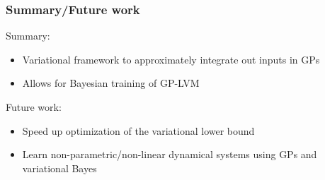\documentclass{beamer}
\begin{document}
%
%
%
%
%
%
%
%
%
%
%
%



\frame
{
\frametitle{Summary/Future work}


Summary: 

\begin{itemize}

\item Variational framework to approximately integrate 
      out inputs in GPs 

\item Allows for Bayesian training of GP-LVM
        
\end{itemize} 

Future work: 

\begin{itemize}

\item Speed up optimization of the variational lower bound
%
%
%

 \item Learn non-parametric/non-linear 
         dynamical systems using GPs and variational Bayes    

\end{itemize}

}
\end{document}
